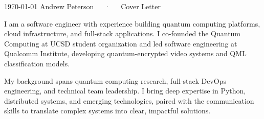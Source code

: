 \documentclass[11pt, letterpaper]{awesome-cv}
\begin{document}
\makecvheader[R]

\makecvfooter
  {\today}
  {Andrew Peterson~~~·~~~Cover Letter}
  {}

\makelettertitle

\begin{cvletter}

I am a software engineer with experience building quantum computing platforms, cloud infrastructure, and full-stack applications. I co-founded the Quantum Computing at UCSD student organization and led software engineering at Qualcomm Institute, developing quantum-encrypted video systems and QML classification models.

My background spans quantum computing research, full-stack DevOps engineering, and technical team leadership. I bring deep expertise in Python, distributed systems, and emerging technologies, paired with the communication skills to translate complex systems into clear, impactful solutions.

\end{cvletter}


\makeletterclosing
\end{document}
